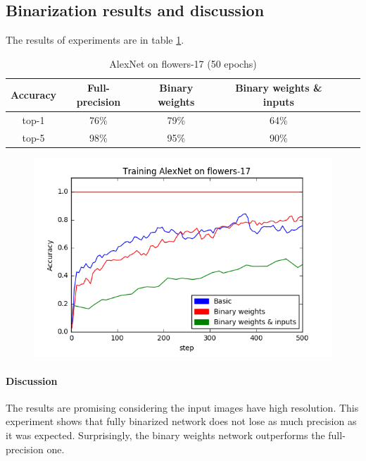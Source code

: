\documentclass[licencjacka]{pracamgr}
\begin{document}
		\subsection{Binarization results and discussion}
		        The results of experiments are in table \ref{table:1}.
		        \begin{table}[H]
				\caption{AlexNet on flowers-17 (50 epochs)}
                    \centering
                    \begin{tabular}{c c c c c c}
                    \hline\hline
			    Accuracy & Full-precision & Binary weights & Binary weights \& inputs \\ [0.5ex]
                    \hline
			    top-1 & 76\% & 79\% & 64\% \\
                    \hline
			    top-5 & 98\% & 95\% & 90\% \\
                    \hline
                    \end{tabular}
                    \label{table:1}
	            \end{table}
	            \begin{figure}[h]
				\centering
				\includegraphics[width=\textwidth]{images/AlexNet-flowers17}
			\end{figure}
	            
		        \paragraph{Discussion} 
                        The results are promising considering the input images have high resolution. This experiment shows that fully binarized network does not lose as much precision as it was expected. Surprisingly, the binary weights network outperforms the full-precision one.
\end{document}
